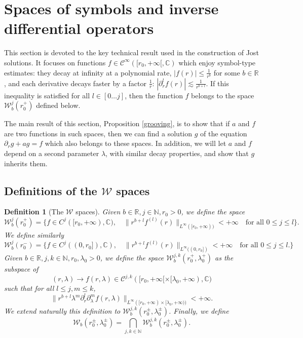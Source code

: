 \documentclass[11 pt]{amsart}
\newtheorem{definition}{Definition}[section]
\theoremstyle{definition}
\theoremstyle{remark}
\numberwithin{equation}{section}
\begin{document}
\section{Spaces of symbols and inverse differential operators}
\label{sectionspace}

This section is devoted to the key technical result used in the construction
of Jost solutions. It focuses on functions $f \in \mathcal{C}^{\infty} ([r_0, + \infty
[, \mathbb{C})$ which enjoy symbol-type estimates: they decay at infinity at a polynomial rate, $| f (r) | \leqslant
\frac{1}{r^b}$ for some $b \in \mathbb{R}$, and each derivative decays faster by a factor $\frac{1}{r}$: $| \partial_r^l f (r) | \lesssim \frac{1}{r^{b + l}}$. If this inequality is satisfied  for all $l \in [0 \ldots j]$, then the function $f$ belongs to the space
$\mathcal{W}_b^j (r_0^+)$ defined below.

The main result of this section, Proposition \ref{grooving}, is to show that
if $a$ and $f$ are two functions in such spaces, then we can find a solution
$g$ of the equation $\partial_r g + a g = f$ which also belongs to these spaces. In addition, we will let $a$ and $f$ depend on a second parameter $\lambda$, with similar
decay properties, and show that $g$ inherits them.

\subsection{Definitions of the $\mathcal{W}$ spaces}

\begin{definition}[The $\mathcal{W}$ spaces]
  Given $b \in \mathbb{R}, j  \in \mathbb{N}, r_0 > 0$, we define the space
  \[ \mathcal{W}_b^j (r_0^+) = \{ f \in C^j ([r_0, + \infty ),
     \mathbb{C}), \quad \| r^{b + l} f^{(l)} (r)
     \|_{L^{\infty} ([r_0, + \infty ))} < + \infty \quad \mbox{for all }0\leq j \leq l\} . \]
  We define similarly
  \[ \mathcal{W}_b^j (r_0^-) = \{ f \in C^j ((0,r_0]),
     \mathbb{C}), \quad \| r^{b + l} f^{(l)} (r)
     \|_{L^{\infty} ((0, r_0])} < + \infty  \quad \mbox{for all }0\leq j \leq l . \}\]
  Given $b \in \mathbb{R}, j, k \in \mathbb{N}, r_0, \lambda_0 > 0$, we
  define the space $\mathcal{W}^{j, k}_{b} (r_0^+, \lambda_0^+)$ as the
  subspace of
  \[ (r, \lambda) \rightarrow f (r, \lambda) \in \mathcal{C}^{j,k} ([r_0, + \infty
     [\times [\lambda_0, + \infty ), \mathbb{C}) \]
  such that for all $l \leqslant j, m \leqslant k$,
  \[ \| r^{b + l} \lambda^{ m} \partial_r^l \partial_{\lambda}^m f  (r,
     \lambda) \|_{L^{\infty} ([r_0, + \infty )\times [\lambda_0, + \infty ))}
     < + \infty . \]
  We extend naturally this definition to $\mathcal{W}^{j, k}_{b}
  (r_0^{\pm}, \lambda_0^{\pm})$. Finally, we define
  \[ \mathcal{W}_{b} (r_0^{\pm}, \lambda_0^{\pm}) = \bigcap_{j, k \in
     \mathbb{N}} \mathcal{W}^{j, k}_{b} (r_0^{\pm}, \lambda_0^{\pm}) . \]
\end{definition}
\end{document}
